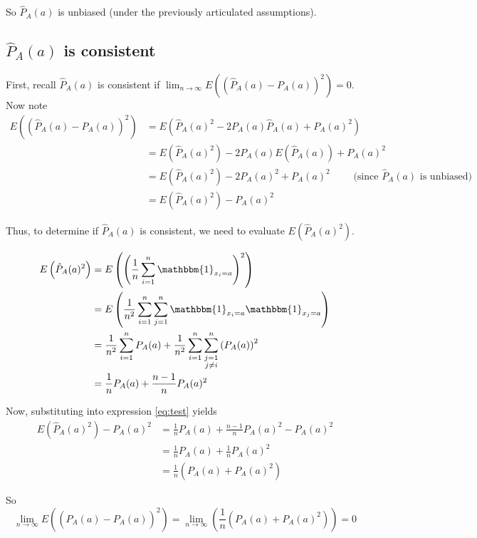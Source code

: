 \documentclass[paper=a4, fontsize=11pt]{scrartcl} %
\numberwithin{equation}{section} %
\numberwithin{figure}{section} %
\numberwithin{table}{section} %
\begin{document}
So $\hat{P}_A(a)$ is unbiased (under the previously articulated assumptions).

\subsection{$\hat{P}_A(a)$ is consistent}

First, recall $\hat{P}_A(a)$ is consistent if $\lim_{n \to \infty} E\left((\hat{P}_A(a) - P_A(a))^2\right) = 0$.
Now note
\begin{align}
E\left((\hat{P}_A(a) - P_A(a))^2\right) &= E\left(\hat{P}_A(a)^2 - 2P_A(a)\hat{P}_A(a) + P_A(a)^2\right) \nonumber \\
   &= E\left(\hat{P}_A(a)^2\right) - 2P_A(a)E\left(\hat{P}_A(a)\right) + P_A(a)^2  \nonumber \\
   &= E\left(\hat{P}_A(a)^2\right) - 2P_A(a)^2 + P_A(a)^2 \qquad{} \textrm{ (since $\hat{P}_A(a)$ is unbiased)}  \nonumber \\
   &= E\left(\hat{P}_A(a)^2\right) - P_A(a)^2 \label{eq:test}
\end{align}

Thus, to determine if $\hat{P}_A(a)$ is consistent, we need to evaluate $E\left(\hat{P}_A(a)^2\right)$.

\begin{align*}
E\left(\hat{P}_A(a)^2\right) &= E\left( \left(  \frac{1}{n} \sum_{i = 1}^{n} \mathbbm{1}_{x_i = a} \right)^2\right) \\
   &= E\left(  \frac{1}{n^2} \sum_{i = 1}^{n}\sum_{j = 1}^{n} \mathbbm{1}_{x_i = a}\mathbbm{1}_{x_j = a} \right)\\
   &= \frac{1}{n^2} \sum_{i = 1}^{n} P_A(a) + \frac{1}{n^2}\sum_{i=1}^{n} \sum_{\substack{j = 1 \\ j \ne i}}^{n}\left(P_A(a)\right)^2\\
   &= \frac{1}{n} P_A(a) + \frac{n-1}{n}P_A(a)^2
\end{align*}

Now, substituting into expression \eqref{eq:test} yields
\begin{align*}
   E(\hat{P}_A(a)^2) - P_A(a)^2 &= \frac{1}{n} P_A(a) + \frac{n-1}{n}P_A(a)^2 - P_A(a)^2 \\
   &=  \frac{1}{n} P_A(a) + \frac{1}{n}P_A(a)^2 \\
   &=  \frac{1}{n} \left(P_A(a) + P_A(a)^2 \right)
\end{align*}

So 
\[\lim_{n \to \infty} E\left(\left(\hat{P}_A(a) - P_A(a)\right)^2\right) = \lim_{n \to \infty} \left(\frac{1}{n} \left(P_A(a) + P_A(a)^2 \right) \right) = 0\]
\end{document}
